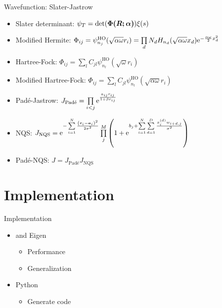 \documentclass[10pt, t]{beamer}
\begin{document}
\begin{frame}[fragile]{Wavefunction: Slater-Jastrow}
    \begin{itemize}[<+->]
        \item Slater determinant: $\psi_T =
            \det(\blds{\Phi(\blds{R};\blds{\alpha})}) \xi(s)$
        \item Modified Hermite: $\Phi_{ij} =
            \psi^{\text{HO}}_{n_j}(\sqrt{\alpha\omega}r_i) = \prod\limits_d N_d
            H_{n_d}(\sqrt{\alpha \omega}x_d)\me^{-\frac{\alpha\omega}{2}x^2_d}$
        \item Hartree-Fock: $\Phi_{ij} =
            \sum\limits_lC_{jl}\psi^{\text{HO}}_{n_l}\left(\sqrt{\omega}r_i\right)$
        \item Modified Hartree-Fock: $\Phi_{ij} =
            \sum\limits_lC_{jl}\psi^{\text{HO}}_{n_l}\left(\sqrt{\alpha\omega}r_i\right)$
        \item Pad\'e-Jastrow: $J_{\text{Pad\'e}} = \prod\limits_{i<j}
            \me^{\frac{a_{ij} r_{ij}}{1 + \beta r_{ij}}}$
        \item NQS: $J_{\text{NQS}} = \me^{-\suml{i=1}{N} \frac{\left(\bm{r}_i -
            \bm{a}_i\right)^2}{2\sigma^2}}\prod\limits^{M}_j \left(1 + \me^{b_j
            + \suml{i=1}{N}\suml{d=1}{D}
            \frac{x^{(d)}_iw_{i+d,j}}{\sigma^2}}\right)$
        \item Pad\'e-NQS: $J = J_{\text{Pad\'e}}J_{\text{NQS}}$
    \end{itemize}
\end{frame}

\section{Implementation}

\begin{frame}[fragile]{Implementation}
    \begin{itemize}[<+->]
        \item \CC and Eigen
            \begin{itemize}
                \item Performance
                \item Generalization
            \end{itemize}
        \item Python
            \begin{itemize}
               \item Generate \CC code 
            \end{itemize}
    \end{itemize}
\end{frame}
\end{document}
